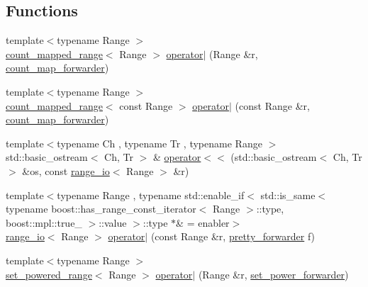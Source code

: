 \subsection*{\-Functions}
\begin{DoxyCompactItemize}
\item 
{\footnotesize template$<$typename Range $>$ }\\\hyperlink{classyuh_1_1range__detail_1_1count__mapped__range}{count\-\_\-mapped\-\_\-range}$<$ \-Range $>$ \hyperlink{namespaceyuh_1_1range__detail_a128712717771a96265117e448135e6b8}{operator$|$} (\-Range \&r, \hyperlink{structyuh_1_1range__detail_1_1count__map__forwarder}{count\-\_\-map\-\_\-forwarder})
\item 
{\footnotesize template$<$typename Range $>$ }\\\hyperlink{classyuh_1_1range__detail_1_1count__mapped__range}{count\-\_\-mapped\-\_\-range}$<$ const \-Range $>$ \hyperlink{namespaceyuh_1_1range__detail_a5be2a0d7d9e02960bca7acc73d610efc}{operator$|$} (const \-Range \&r, \hyperlink{structyuh_1_1range__detail_1_1count__map__forwarder}{count\-\_\-map\-\_\-forwarder})
\item 
{\footnotesize template$<$typename Ch , typename Tr , typename Range $>$ }\\std\-::basic\-\_\-ostream$<$ \-Ch, \-Tr $>$ \& \hyperlink{namespaceyuh_1_1range__detail_a6a69e861128439de1b09739e9d88d6c6}{operator$<$$<$} (std\-::basic\-\_\-ostream$<$ \-Ch, \-Tr $>$ \&os, const \hyperlink{structyuh_1_1range__detail_1_1range__io}{range\-\_\-io}$<$ \-Range $>$ \&r)
\item 
{\footnotesize template$<$typename Range , typename std\-::enable\-\_\-if$<$ std\-::is\-\_\-same$<$ typename boost\-::has\-\_\-range\-\_\-const\-\_\-iterator$<$ Range $>$\-::type, boost\-::mpl\-::true\-\_\- $>$\-::value $>$\-::type $\ast$\&  = enabler$>$ }\\\hyperlink{structyuh_1_1range__detail_1_1range__io}{range\-\_\-io}$<$ \-Range $>$ \hyperlink{namespaceyuh_1_1range__detail_a80175b98364b0c303ffdfcb32617ce4d}{operator$|$} (const \-Range \&r, \hyperlink{structyuh_1_1range__detail_1_1pretty__forwarder}{pretty\-\_\-forwarder} f)
\item 
{\footnotesize template$<$typename Range $>$ }\\\hyperlink{classyuh_1_1range__detail_1_1set__powered__range}{set\-\_\-powered\-\_\-range}$<$ \-Range $>$ \hyperlink{namespaceyuh_1_1range__detail_ade0b1e4024c0bba4ebcc9ba0a977512a}{operator$|$} (\-Range \&r, \hyperlink{structyuh_1_1range__detail_1_1set__power__forwarder}{set\-\_\-power\-\_\-forwarder})

\end{DoxyCompactItemize}

